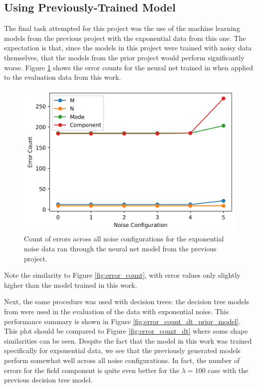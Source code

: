 \documentclass[conference]{IEEEtran}
\begin{document}
\subsection{Using Previously-Trained Model}
The final task attempted for this project was the use of the machine learning models from the previous project with the exponential data from this one.
The expectation is that, since the models in this project were trained with noisy data themselves, that the models from the prior project would perform significantly worse.
Figure \ref{fig:error_count_nn_prior_model} shows the error counts for the neural net trained in \cite{newberry_machine_2022-1} when applied to the evaluation data from this work.

\begin{figure}
	\centering
	\includegraphics[width=1\linewidth]{images/error_count_nn_prior_model}
	\caption{Count of errors across all noise configurations for the exponential noise data ran through the neural net model from the previous project.}
	\label{fig:error_count_nn_prior_model}
\end{figure}

Note the similarity to Figure \ref{fig:error_count}, with error values only slightly higher than the model trained in this work.

Next, the same procedure was used with decision trees: the decision tree models from \cite{newberry_machine_2022-1} were used in the evaluation of the data with exponential noise.
This performance summary is shown in Figure \ref{fig:error_count_dt_prior_model}.
This plot should be compared to Figure \ref{fig:error_count_dt} where some shape similarities can be seen.
Despite the fact that the model in this work was trained specifically for exponential data, we see that the previously generated models perform somewhat well across all noise configurations. In fact, the number of errors for the field component is quite even better for the $\lambda=100$ case with the previous decision tree model. 
\end{document}
